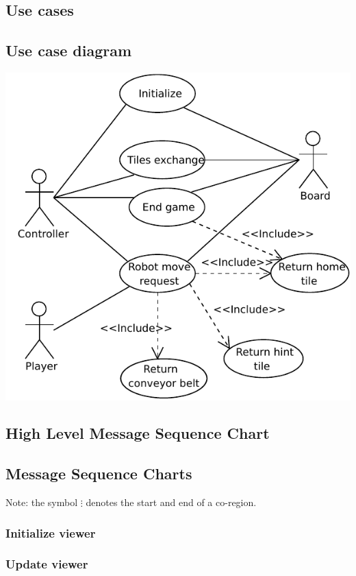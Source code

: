 \subsection{Use cases}
	
\subsection{Use case diagram}
	\includegraphics[width=\linewidth]{usecases/diagram.pdf}	

\subsection{High Level Message Sequence Chart}
    
	
\subsection{Message Sequence Charts}
	Note: the symbol $\vdots$ denotes the start and end of a co-region.

    \subsubsection{Initialize viewer}
    

    \subsubsection{Update viewer}
    

